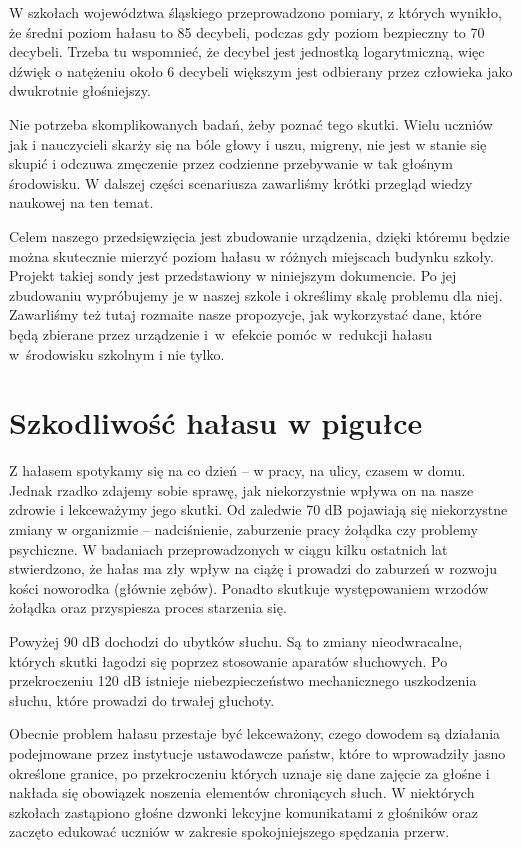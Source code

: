 \documentclass[12pt, a4paper]{article}
\begin{document}
W szkołach województwa śląskiego przeprowadzono pomiary, z których wynikło, że średni poziom hałasu to 85 decybeli\cite{dz}, podczas gdy poziom bezpieczny to 70 decybeli\cite{wikihalas}. Trzeba tu wspomnieć, że decybel jest jednostką logarytmiczną, więc dźwięk o natężeniu około 6 decybeli większym jest odbierany przez człowieka jako dwukrotnie głośniejszy.

Nie potrzeba skomplikowanych badań, żeby poznać tego skutki. Wielu uczniów jak i nauczycieli skarży się na bóle głowy i uszu, migreny, nie jest w stanie się skupić i odczuwa zmęczenie przez codzienne przebywanie w tak głośnym środowisku. W dalszej części scenariusza zawarliśmy krótki przegląd wiedzy naukowej na ten temat.

Celem naszego przedsięwzięcia jest zbudowanie urządzenia, dzięki któremu będzie można skutecznie mierzyć poziom hałasu w różnych miejscach budynku szkoły. Projekt takiej sondy jest przedstawiony w niniejszym dokumencie. Po jej zbudowaniu wypróbujemy je w naszej szkole i określimy skalę problemu dla niej. Zawarliśmy też tutaj rozmaite nasze propozycje, jak wykorzystać dane, które będą zbierane przez urządzenie i~w~efekcie pomóc w~redukcji hałasu w~środowisku szkolnym i nie tylko.

\section{Szkodliwość hałasu w pigułce}
Z hałasem spotykamy się na co dzień -- w pracy, na ulicy, czasem w domu. Jednak rzadko zdajemy sobie sprawę, jak niekorzystnie wpływa on na nasze zdrowie i lekceważymy jego skutki. Od zaledwie 70 dB pojawiają się niekorzystne zmiany w organizmie -- nadciśnienie, zaburzenie pracy żołądka czy problemy psychiczne\cite{70db}. W badaniach przeprowadzonych w ciągu kilku ostatnich lat stwierdzono, że hałas ma zły wpływ na ciążę i prowadzi do zaburzeń w rozwoju kości noworodka (głównie zębów). Ponadto skutkuje występowaniem wrzodów żołądka oraz przyspiesza proces starzenia się.

Powyżej 90 dB dochodzi do ubytków słuchu. Są to zmiany nieodwracalne, których skutki łagodzi się poprzez stosowanie aparatów słuchowych. Po przekroczeniu 120 dB istnieje niebezpieczeństwo mechanicznego uszkodzenia słuchu, które prowadzi do trwałej głuchoty.

Obecnie problem hałasu przestaje być lekceważony, czego dowodem są działania podejmowane przez instytucje ustawodawcze państw, które to wprowadziły jasno określone granice, po przekroczeniu których uznaje się dane zajęcie za głośne i nakłada się obowiązek noszenia elementów chroniących słuch. W niektórych szkołach zastąpiono głośne dzwonki lekcyjne komunikatami z głośników oraz zaczęto edukować uczniów w zakresie spokojniejszego spędzania przerw.
\end{document}
